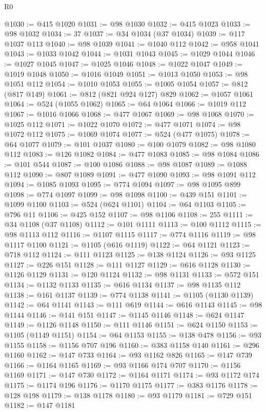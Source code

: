 \begin{lexlean}{R0}
\begin{coremodule}
@1030 := @415 @1020
@1031 := @98 @1030
@1032 := @415 @1023
@1033 := @98 @1032
@1034 := 37
@1037 := @34 @1034 (@37 @1034)
@1039 := @117 @1037 @113
@1040 := @98 @1039
@1041 := @1040 @112
@1042 := @958 @1041
@1043 := @1033 @1042
@1044 := @1031 @1043
@1045 := @1029 @1044
@1046 := @1027 @1045
@1047 := @1025 @1046
@1048 := @1022 @1047
@1049 := @1019 @1048
@1050 := @1016 @1049
@1051 := @1013 @1050
@1053 := @98 @1051 @112
@1054 := @1010 @1053
@1055 := @1005 @1054
@1057 := @812 (@817 @149)
@1061 := @812 (@821 @924 @127) @829
@1062 := @1057 @1061
@1064 := @524 (@1055 @1062)
@1065 := @64 @1064
@1066 := @1019 @112
@1067 := @1016 @1066
@1068 := @477 @1067
@1069 := @98 @1068
@1070 := @1025 @112
@1071 := @1022 @1070
@1072 := @477 @1071
@1074 := @98 @1072 @112
@1075 := @1069 @1074
@1077 := @524 (@477 @1075)
@1078 := @64 @1077
@1079 := @101 @1037
@1080 := @100 @1079
@1082 := @98 @1080 @112
@1083 := @126 @1082
@1084 := @477 @1083
@1085 := @98 @1084
@1086 := @101 @544
@1087 := @100 @1086
@1088 := @98 @1087
@1089 := @1088 @112
@1090 := @807 @1089
@1091 := @477 @1090
@1093 := @98 @1091 @112
@1094 := @1085 @1093
@1095 := @774 @1094
@1097 := @98 @1095 @899
@1098 := @774 @1097
@1099 := @98 @1098
@1100 := @439 @151
@1101 := @1099 @1100
@1103 := @524 (@624 @1101)
@1104 := @64 @1103
@1105 := @796 @11
@1106 := @425 @152
@1107 := @98 @1106
@1108 := 255
@1111 := @34 @1108 (@37 @1108)
@1112 := @101 @1111
@1113 := @100 @1112
@1115 := @98 @1113 @112
@1116 := @1107 @1115
@1117 := @774 @1116
@1119 := @98 @1117 @1100
@1121 := @1105 (@616 @1119)
@1122 := @64 @1121
@1123 := @718 @112
@1124 := @111 @1123
@1125 := @138 @1124
@1126 := @93 @1125
@1127 := @226 @151
@1128 := @111 @1127
@1129 := @616 @1128
@1130 := @1126 @1129
@1131 := @120 @1124
@1132 := @98 @1131
@1133 := @572 @151
@1134 := @1132 @1133
@1135 := @616 @1134
@1137 := @98 @1135 @112
@1138 := @161 @1137
@1139 := @774 @1138
@1141 := @1105 (@1130 @1139)
@1142 := @64 @1141
@1143 := @111 @619
@1144 := @616 @1143
@1145 := @98 @1144
@1146 := @141 @151
@1147 := @1145 @1146
@1148 := @624 @1147
@1149 := @1126 @1148
@1150 := @111 @1146
@1151 := @624 @1150
@1153 := @1105 (@1149 @1151)
@1154 := @64 @1153
@1155 := @138 @478
@1156 := @93 @1155
@1158 := @1156 @707 @196
@1160 := @383 @1158 @140
@1161 := @296 @1160
@1162 := @147 @733
@1164 := @93 @1162 @826
@1165 := @147 @739
@1166 := @1164 @1165
@1169 := @93 @1166 @174 @707
@1170 := @1156 @1169
@1171 := @147 @730
@1172 := @1164 @1171
@1174 := @93 @1172 @174
@1175 := @1174 @196
@1176 := @1170 @1175
@1177 := @383 @1176
@1178 := @128 @198
@1179 := @138 @1178
@1180 := @93 @1179
@1181 := @729 @151
@1182 := @147 @1181

\end{coremodule}
\end{lexlean}
